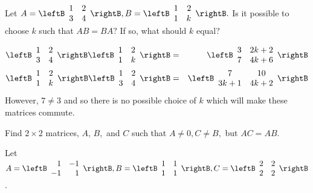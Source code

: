 \begin{enumialphparenastyle}
\begin{ex} Let $A=\leftB
\begin{array}{rr}
1 & 2 \\
3 & 4
\end{array}
\rightB ,B=\leftB
\begin{array}{rr}
1 & 2 \\
1 & k
\end{array}
\rightB .$ Is it possible to choose $k$ such that $AB=BA?$ If so, what
should $k$ equal?
\begin{sol}
\begin{eqnarray*}
\leftB
\begin{array}{cc}
1 & 2 \\
3 & 4
\end{array}
\rightB \leftB
\begin{array}{cc}
1 & 2 \\
1 & k
\end{array}
\rightB &=& \leftB
\begin{array}{cc}
3 & 2k+2 \\
7 & 4k+6
\end{array}
\rightB \\
\leftB
\begin{array}{cc}
1 & 2 \\
1 & k
\end{array}
\rightB \leftB
\begin{array}{cc}
1 & 2 \\
3 & 4
\end{array}
\rightB &=& \leftB
\begin{array}{cc}
7 & 10 \\
3k+1 & 4k+2
\end{array}
\rightB
\end{eqnarray*}
 However, $7\neq 3$ and so there is no possible choice of $k$ which
will make these matrices commute.
\end{sol}
\end{ex}

\begin{ex} Find $2\times 2$ matrices, $A$, $B,$ and $C$ such that $A\neq 0,C\neq B,$
but $AC=AB.$ 
\begin{sol}
Let $A = \leftB
\begin{array}{rr}
1 & -1 \\
-1 & 1
\end{array} 
\rightB, B = \leftB
\begin{array}{cc}
1 & 1 \\
1 & 1
\end{array}
\rightB, C = \leftB
\begin{array}{cc}
2 & 2 \\
2 & 2
\end{array}
\rightB$. 


\end{sol}
\end{ex}
\end{enumialphparenastyle}

